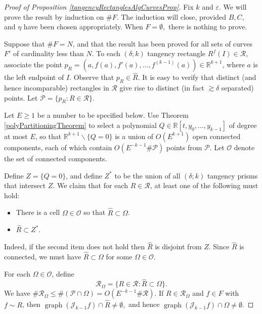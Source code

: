 \documentclass[letterpaper, reqno,11pt]{article}
\numberwithin{equation}{section}
\newcommand{\RR}{\mathbb{R}}
\newcommand{\eps}{\varepsilon}
\numberwithin{thm}{section}
\theoremstyle{remark}
\begin{document}
\begin{proof}[Proof of Proposition \ref{tangencyRectanglesAlgCurvesProp}]
Fix $k$ and $\eps$.  We will prove the result by induction on $\# F$. The induction will close, provided $B,C,$ and $\eta$ have been chosen appropriately. When $F=\emptyset,$ there is nothing to prove. 

\medskip

Suppose that $\#F = N$, and that the result has been proved for all sets of curves $F'$ of cardinality less than $N$. To each $(\delta;k)$ tangency rectangle $R^f(I)\in\mathcal{R}$, associate the point $p_R = (a, f(a), f'(a),\ldots, f^{(k-1)}(a))\in\RR^{k+1}$, where $a$ is the left endpoint of $I$. Observe that $p_R\in\hat R$. It is easy to verify that distinct (and hence incomparable) rectangles in $\mathcal{R}$ give rise to distinct (in fact $\gtrsim\delta$ separated) points. Let $\mathcal{P}=\{p_R\colon R\in\mathcal{R}\}$.

Let $E\geq 1$ be a number to be specified below. Use Theorem \ref{polyPartitioningTheorem} to select a polynomial $Q\in\RR[t, y_0,\ldots,y_{k-1}]$ of degree at most $E$, so that $\RR^{k+1}\backslash\{Q=0\}$ is a union of $O(E^{k+1})$ open connected components, each of which contain $O(E^{-k-1}\#\mathcal{P})$ points from $\mathcal{P}$. Let $\mathcal{O}$ denote the set of connected components. 


Define $Z=\{Q=0\}$, and define $Z^*$ to be the union of all $(\delta;k)$ tangency prisms that intersect $Z$. We claim that for each $R\in\mathcal{R}$, at least one of the following must hold:
\begin{itemize}
\item There is a cell $\Omega\in\mathcal{O}$ so that $\hat R\subset \Omega$.

\item  $\hat R\subset Z^*$.
\end{itemize}
Indeed, if the second item does not hold then $\hat R$ is disjoint from $Z$. Since $\hat R$ is connected, we must have $\hat R\subset \Omega$ for some $\Omega\in \mathcal{O}$. 

For each $\Omega\in \mathcal{O}$, define 
\[
\mathcal{R}_\Omega=\{R\in\mathcal{R}\colon \hat R \subset \Omega\}.
\]
We have $\#\mathcal{R}_{\Omega} \leq \#(\mathcal{P}\cap \Omega) =O(E^{-k-1}\#\mathcal{R})$. If $R\in\mathcal{R}_{\Omega}$ and $f\in F$ with $f\sim R$, then $\operatorname{graph}(\mathcal{J}_{k-1}f)\cap \hat R\neq\emptyset,$ and hence $\operatorname{graph}(\mathcal{J}_{k-1}f)\cap \Omega\neq\emptyset$.


\end{proof}
\end{document}
